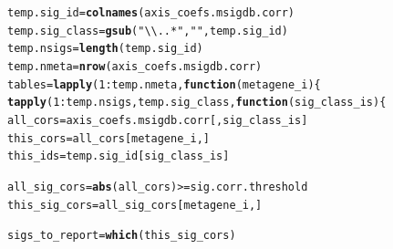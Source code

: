 \documentclass{article}\usepackage[]{graphicx}\usepackage[]{color}
\makeatletter
\newcommand{\hlnum}[1]{\textcolor[rgb]{0.686,0.059,0.569}{#1}}%
\newcommand{\hlstr}[1]{\textcolor[rgb]{0.192,0.494,0.8}{#1}}%
\newcommand{\hlopt}[1]{\textcolor[rgb]{0,0,0}{#1}}%
\newcommand{\hlstd}[1]{\textcolor[rgb]{0.345,0.345,0.345}{#1}}%
\newcommand{\hlkwa}[1]{\textcolor[rgb]{0.161,0.373,0.58}{\textbf{#1}}}%
\newcommand{\hlkwb}[1]{\textcolor[rgb]{0.69,0.353,0.396}{#1}}%
\newcommand{\hlkwc}[1]{\textcolor[rgb]{0.333,0.667,0.333}{#1}}%
\newcommand{\hlkwd}[1]{\textcolor[rgb]{0.737,0.353,0.396}{\textbf{#1}}}%
\newenvironment{kframe}{%
 \def\at@end@of@kframe{}%
 \ifinner\ifhmode%
  \def\at@end@of@kframe{\end{minipage}}%
  \begin{minipage}{\columnwidth}%
 \fi\fi%
 \def\FrameCommand##1{\hskip\@totalleftmargin \hskip-\fboxsep
 \colorbox{shadecolor}{##1}\hskip-\fboxsep
     \hskip-\linewidth \hskip-\@totalleftmargin \hskip\columnwidth}%
 \MakeFramed {\advance\hsize-\width
   \@totalleftmargin\z@ \linewidth\hsize
   \@setminipage}}%
 {\par\unskip\endMakeFramed%
 \at@end@of@kframe}
\newenvironment{knitrout}{}{} %
\makeatother
\begin{document}
\begin{knitrout}
\color{fgcolor}\begin{kframe}
\begin{alltt}
\hlstd{temp.sig_id} \hlkwb{=} \hlkwd{colnames}\hlstd{(axis_coefs.msigdb.corr)}
\hlstd{temp.sig_class} \hlkwb{=} \hlkwd{gsub}\hlstd{(}\hlstr{"\textbackslash{}\textbackslash{}..*"}\hlstd{,} \hlstr{""}\hlstd{, temp.sig_id)}
\hlstd{temp.nsigs} \hlkwb{=} \hlkwd{length}\hlstd{(temp.sig_id)}
\hlstd{temp.nmeta} \hlkwb{=} \hlkwd{nrow}\hlstd{(axis_coefs.msigdb.corr)}
\hlstd{tables} \hlkwb{=} \hlkwd{lapply}\hlstd{(}\hlnum{1}\hlopt{:}\hlstd{temp.nmeta,} \hlkwa{function}\hlstd{(}\hlkwc{metagene_i}\hlstd{) \{}
    \hlkwd{tapply}\hlstd{(}\hlnum{1}\hlopt{:}\hlstd{temp.nsigs, temp.sig_class,} \hlkwa{function}\hlstd{(}\hlkwc{sig_class_is}\hlstd{) \{}
        \hlstd{all_cors} \hlkwb{=} \hlstd{axis_coefs.msigdb.corr[, sig_class_is]}
        \hlstd{this_cors} \hlkwb{=} \hlstd{all_cors[metagene_i, ]}
        \hlstd{this_ids} \hlkwb{=} \hlstd{temp.sig_id[sig_class_is]}

        \hlstd{all_sig_cors} \hlkwb{=} \hlkwd{abs}\hlstd{(all_cors)} \hlopt{>=} \hlstd{sig.corr.threshold}
        \hlstd{this_sig_cors} \hlkwb{=} \hlstd{all_sig_cors[metagene_i, ]}

        \hlstd{sigs_to_report} \hlkwb{=} \hlkwd{which}\hlstd{(this_sig_cors)}


\end{alltt}
\end{kframe}
\end{knitrout}
\end{document}

